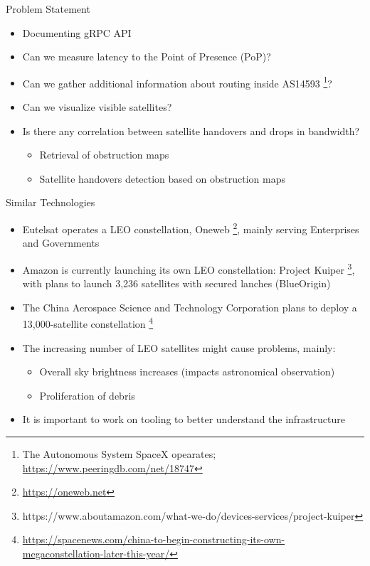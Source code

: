 \documentclass[NET,english,beameralt]{tumbeamer}
\begin{document}
\begin{frame}{Problem Statement}
    \begin{itemize}
        \item Documenting gRPC API
        \item Can we measure latency to the Point of Presence (PoP)?
        \item Can we gather additional information about routing inside AS14593 
              \footnote{The Autonomous System SpaceX opearates; \url{https://www.peeringdb.com/net/18747}}?
        \item Can we visualize visible satellites?
        \item Is there any correlation between satellite handovers and drops in bandwidth?
            \begin{itemize}
                \item Retrieval of obstruction maps
                \item Satellite handovers detection based on obstruction maps
            \end{itemize}
    \end{itemize}
\end{frame}

\begin{frame}{Similar Technologies}
    \begin{itemize}
        \item Eutelsat operates a LEO constellation, Oneweb \footnote{\url{https://oneweb.net}}, mainly serving
              Enterprises and Governments
        \item Amazon is currently launching its own LEO constellation: Project Kuiper
              \footnote{https://www.aboutamazon.com/what-we-do/devices-services/project-kuiper}, with plans to launch
              3,236 satellites with secured lanches (BlueOrigin)
        \item The China Aerospace Science and Technology Corporation plans to deploy a 13,000-satellite constellation
              \footnote{\url{https://spacenews.com/china-to-begin-constructing-its-own-megaconstellation-later-this-year/}}
        \item The increasing number of LEO satellites might cause problems, mainly:
        \begin{itemize}
            \item Overall sky brightness increases (impacts astronomical observation)
            \item Proliferation of debris
        \end{itemize}
        \item It is important to work on tooling to better understand the infrastructure
    \end{itemize}
\end{frame}
\end{document}
